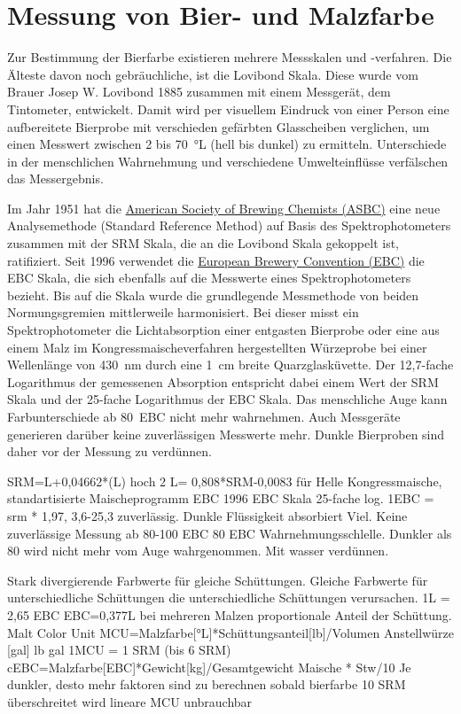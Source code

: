 \documentclass[a4paper,parskip=half]{scrartcl}
\begin{document}
\section*{Messung von Bier- und Malzfarbe}

Zur Bestimmung der Bierfarbe existieren mehrere Messskalen und -verfahren. Die Älteste davon noch gebräuchliche, ist die Lovibond Skala. Diese wurde vom Brauer Josep W. Lovibond 1885 zusammen mit einem Messgerät, dem Tintometer, entwickelt. Damit wird per visuellem Eindruck von einer Person eine aufbereitete Bierprobe mit verschieden gefärbten Glasscheiben verglichen, um einen Messwert zwischen 2 bis 70~°L (hell bis dunkel) zu ermitteln. Unterschiede in der menschlichen Wahrnehmung und verschiedene Umwelteinflüsse verfälschen das Messergebnis. \parencite{KrausWeyermann2021a}

Im Jahr 1951 hat die \href{https://www.asbcnet.org}{American Society of Brewing Chemists (ASBC)} eine neue Analysemethode (Standard Reference Method) auf Basis des Spektrophotometers zusammen mit der SRM Skala, die an die Lovibond Skala gekoppelt ist, ratifiziert. Seit 1996 verwendet die \href{https://europeanbreweryconvention.eu}{European Brewery Convention (EBC)} die EBC Skala, die sich ebenfalls auf die Messwerte eines Spektrophotometers bezieht. Bis auf die Skala wurde die grundlegende Messmethode von beiden Normungsgremien mittlerweile harmonisiert. Bei dieser misst ein Spektrophotometer die Lichtabsorption einer entgasten Bierprobe oder eine aus einem Malz im Kongressmaischeverfahren hergestellten Würzeprobe bei einer Wellenlänge von 430~nm durch eine 1~cm breite Quarzglasküvette. Der 12,7-fache Logarithmus der gemessenen Absorption entspricht dabei einem Wert der SRM Skala und der 25-fache Logarithmus der EBC Skala. Das menschliche Auge kann Farbunterschiede ab 80~EBC nicht mehr wahrnehmen. Auch Messgeräte generieren darüber keine zuverlässigen Messwerte mehr. Dunkle Bierproben sind daher vor der Messung zu verdünnen. \parencite{KrausWeyermann2021a}



\parencite{KrausWeyermann2021a}
SRM=L+0,04662*(L) hoch 2
L= 0,808*SRM-0,0083 für Helle
Kongressmaische, standartisierte Maischeprogramm
EBC 1996 EBC Skala 25-fache log. 1EBC = srm * 1,97,
3,6-25,3 zuverlässig. 
Dunkle Flüssigkeit absorbiert Viel. Keine zuverlässige Messung ab 80-100 EBC
80 EBC Wahrnehmungsschlelle. Dunkler als 80 wird nicht mehr vom Auge wahrgenommen.
Mit wasser verdünnen. 

\parencite{KrausWeyermann2021b}
Stark divergierende Farbwerte für gleiche Schüttungen.
Gleiche Farbwerte für unterschiedliche Schüttungen die 
unterschiedliche Schüttungen verursachen.
1L = 2,65 EBC
EBC=0,377L
bei mehreren Malzen proportionale Anteil der Schüttung.
Malt Color Unit MCU=Malzfarbe[°L]*Schüttungsanteil[lb]/Volumen Anstellwürze [gal]
lb gal 
1MCU = 1 SRM (bis 6 SRM)
cEBC=Malzfarbe[EBC]*Gewicht[kg]/Gesamtgewicht Maische * Stw/10 
Je dunkler, desto mehr faktoren sind zu berechnen
sobald bierfarbe 10 SRM überschreitet wird lineare MCU unbrauchbar
\end{document}
